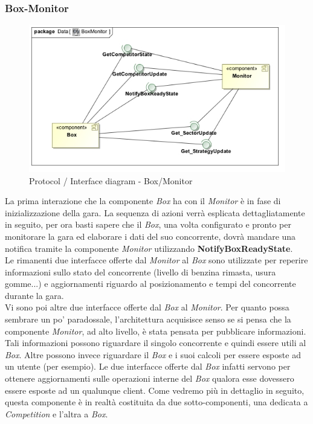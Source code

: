 \subsubsection{Box-Monitor}
\begin{center}
\begin{figure}[h!]
	\includegraphics[scale=0.55]{img/InteractionDiagram/Implementation_Diagram__BoxMonitor.jpg}
\caption{Protocol / Interface diagram - Box/Monitor}
\end{figure}
\end{center}
La prima interazione che la componente \emph{Box} ha con il \emph{Monitor} \`{e} in fase di inizializzazione della gara. 
La sequenza di azioni verr\`{a} esplicata
dettagliatamente in seguito, per ora basti sapere che il \emph{Box}, una volta configurato e pronto per monitorare 
la gara ed elaborare i dati del suo
concorrente, dovr\`{a} mandare una notifica tramite la componente \emph{Monitor} utilizzando \textbf{NotifyBoxReadyState}.\\
Le rimanenti due interfacce offerte dal \emph{Monitor} al \emph{Box} sono utilizzate per reperire informazioni sullo stato del 
concorrente (livello di benzina rimasta, usura gomme...) e
aggiornamenti riguardo al posizionamento e tempi del concorrente durante la gara.\\
Vi sono poi altre due interfacce offerte dal \emph{Box} al \emph{Monitor}. Per quanto possa sembrare un po' paradossale, l'architettura
acquisisce senso se si pensa che la componente \emph{Monitor}, ad alto livello, \`{e} stata pensata per pubblicare informazioni. Tali
informazioni possono riguardare il singolo concorrente e quindi essere utili al \emph{Box}. Altre possono invece riguardare il \emph{Box} e 
i suoi calcoli per essere esposte ad un utente (per esempio). Le due interfacce offerte dal \emph{Box} infatti servono per ottenere
aggiornamenti sulle operazioni interne del \emph{Box} qualora esse dovessero essere esposte ad un qualunque client. Come vedremo pi\`{u}
in dettaglio in seguito, questa componente \`{e} in realt\`{a} costituita da due sotto-componenti, una dedicata a \emph{Competition} e l'altra a
\emph{Box}.
